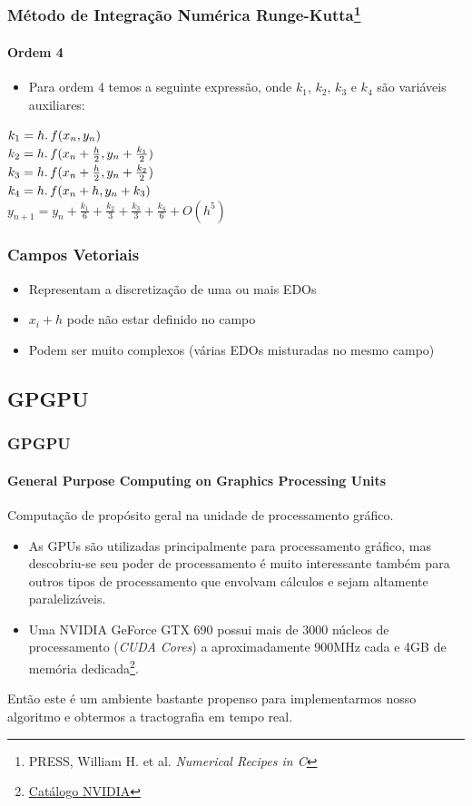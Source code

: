 \documentclass[brazil, 10pt]{beamer}
\begin{document}
\begin{frame}
  \frametitle{Método de Integração Numérica Runge-Kutta\footnote{PRESS, William H. et al. \textit{Numerical Recipes in C}}}
  \framesubtitle{Ordem 4}
  \begin{itemize}
    \item Para ordem 4 temos a seguinte expressão, onde $ k_{1} $, $ k_{2} $, $ k_{3} $ e $ k_{4} $ são variáveis auxiliares:
  \end{itemize}
 
  $ k_{1} = h\ldotp f(x_{n},y_{n}) $\\
  $ k_{2} = h\ldotp f(x_{n} + \frac{h}{2},y_{n} + \frac{k_{1}}{2}) $\\
  $ k_{3} = h\ldotp f(x_{n} + \frac{h}{2},y_{n} + \frac{k_{2}}{2}) $\\
  $ k_{4} = h\ldotp f(x_{n} + h,y_{n} + k_{3}) $\\
  $ y_{n+1} = y_{n} + \frac{k_{1}}{6} + \frac{k_{2}}{3} + \frac{k_{3}}{3} + \frac{k_{4}}{6} + O(h^{5}) $ 
  
\end{frame}

\begin{frame}
  \frametitle{Campos Vetoriais}

  \begin{itemize}
    \item Representam a discretização de uma ou mais EDOs
    \item $ x_{i} + h $ pode não estar definido no campo
    \item Podem ser muito complexos (várias EDOs misturadas no mesmo campo)
  \end{itemize}
\end{frame}

\subsection{GPGPU}
\begin{frame}
  \frametitle{GPGPU}
  \framesubtitle{General Purpose Computing on Graphics Processing Units}
  
  Computação de propósito geral na unidade de processamento gráfico.
  
  \begin{itemize}
    \item As GPUs são utilizadas principalmente para processamento gráfico, mas descobriu-se seu poder de processamento é muito interessante também para outros tipos de processamento que envolvam cálculos e sejam altamente paralelizáveis.
    \item Uma NVIDIA GeForce GTX 690 possui mais de 3000 núcleos de processamento (\textit{CUDA Cores}) a aproximadamente 900MHz cada e 4GB de memória dedicada\footnote{\href{http://www.nvidia.com.br/object/geforce-gtx-690-br.html}{Catálogo NVIDIA}}.
  \end{itemize}
  
  Então este é um ambiente bastante propenso para implementarmos nosso algoritmo e obtermos a tractografia em tempo real.
\end{frame}
\end{document}
